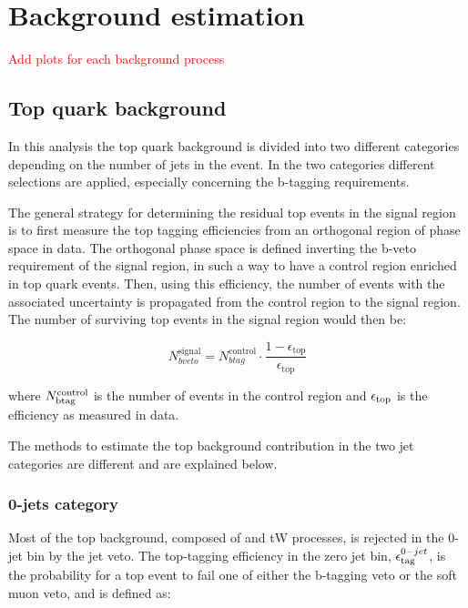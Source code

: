 \section{Background estimation}
\label{sec:Backgrounds}

\textcolor{red}{Add plots for each background process}

\subsection{Top quark background \label{sec:TTBackground}}

In this analysis the top quark background is divided into two different categories depending on the number of jets in the event. In the two categories different selections are applied, especially concerning the b-tagging requirements.

The general strategy for determining the residual top events in the signal region is to first measure the top tagging efficiencies from an orthogonal region of phase space in data. The orthogonal phase space is  defined inverting the b-veto requirement of the signal region, in such a way to have a control region enriched in top quark events.  Then, using this efficiency, the number of events with the associated uncertainty is propagated from the control region to the signal region.
The number of surviving top events in the signal region would then be:

\begin{equation}
 N^{\mathrm{signal}}_{bveto} = N^{\mathrm{control}}_{btag} \cdot \frac{1-\epsilon_{\mathrm{top}}}{\epsilon_{\mathrm{top}}}
\label{eq:top_equation}
\end{equation}

where $N^{\rm control}_{\rm btag}$ is the number of events in the 
control region and $\epsilon_{\rm top}$ is the efficiency as measured
in data.

The methods to estimate the top background contribution in the two jet categories are different and are explained below.


\subsubsection{0-jets category}
Most of the top background, composed of \ttbar and tW processes, is rejected in the 0-jet bin by the
jet veto. The top-tagging efficiency in the zero jet bin, $\epsilon_{\rm tag}^{0-jet}$, is the probability for a top event to
fail one of either the b-tagging veto or the soft muon veto, and is defined as:

